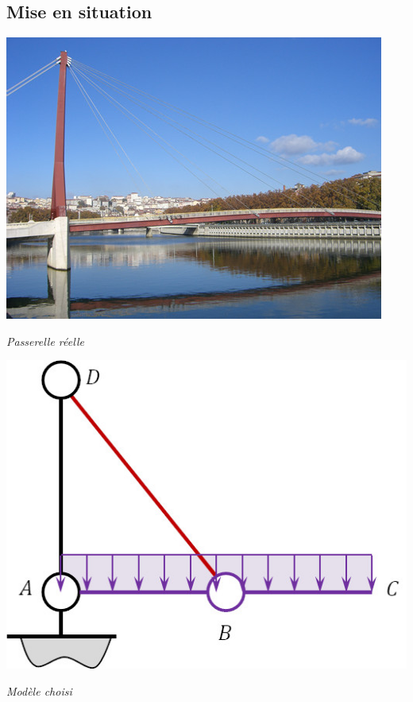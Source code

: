 \documentclass[10pt,fleqn]{article} %
\begin{document}

\vspace{4.5cm}
\pagestyle{fancy}
\thispagestyle{plain}


\def\columnseprulecolor{\color{ocre}}
\setlength{\columnseprule}{0.4pt} 

\begin{multicols}{2}
\section*{Mise en situation}


\begin{center}
\includegraphics[width=.7\linewidth]{images/fig_02}

\textit{Passerelle réelle}
\end{center}

\begin{center}
\includegraphics[width=.8\linewidth]{images/fig_03}

\textit{Modèle choisi}
\end{center}


\end{multicols}
\end{document}
